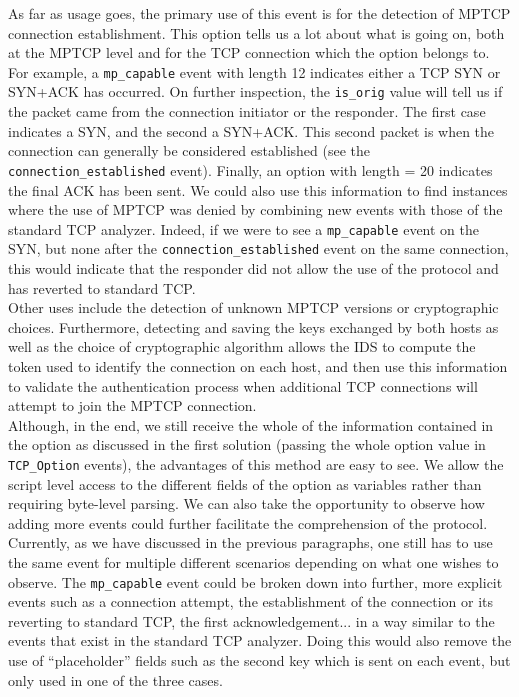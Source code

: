 \documentclass[12pt, a4paper, oneside]{article} %
\begin{document}
As far as usage goes, the primary use of this event is for the detection of MPTCP connection establishment. This option tells us a lot about what is going on, both at the MPTCP level and for the TCP connection which the option belongs to. For example, a \texttt{mp\_capable} event with length 12 indicates either a TCP SYN or SYN+ACK has occurred. On further inspection, the \texttt{is\_orig} value will tell us if the packet came from the connection initiator or the responder. The first case indicates a SYN, and the second a SYN+ACK. This second packet is when the connection can generally be considered established (see the \texttt{connection\_established} event). Finally, an option with length = 20 indicates the final ACK has been sent. We could also use this information to find instances where the use of MPTCP was denied by combining new events with those of the standard TCP analyzer. Indeed, if we were to see a \texttt{mp\_capable} event on the SYN, but none after the \texttt{connection\_established} event on the same connection, this would indicate that the responder did not allow the use of the protocol and has reverted to standard TCP. \\

Other uses include the detection of unknown MPTCP versions or cryptographic choices. Furthermore, detecting and saving the keys exchanged by both hosts as well as the choice of cryptographic algorithm allows the IDS to compute the token used to identify the connection on each host, and then use this information to validate the authentication process when additional TCP connections will attempt to join the MPTCP connection. \\

Although, in the end, we still receive the whole of the information contained in the option as discussed in the first solution (passing the whole option value in \texttt{TCP\_Option} events), the advantages of this method are easy to see. We allow the script level access to the different fields of the option as variables rather than requiring byte-level parsing. We can also take the opportunity to observe how adding more events could further facilitate the comprehension of the protocol. Currently, as we have discussed in the previous paragraphs, one still has to use the same event for multiple different scenarios depending on what one wishes to observe. The \texttt{mp\_capable} event could be broken down into further, more explicit events such as a connection attempt, the establishment of the connection or its reverting to standard TCP, the first acknowledgement... in a way similar to the events that exist in the standard TCP analyzer. Doing this would also remove the use of ``placeholder'' fields such as the second key which is sent on each event, but only used in one of the three cases.
\end{document}
